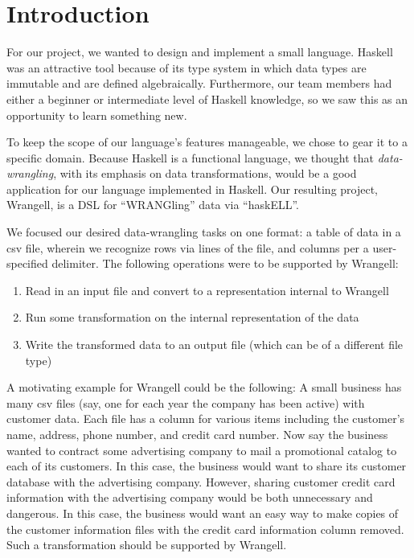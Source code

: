 \documentclass[preprint,nocopyrightspace]{sig-alternate}
\begin{document}
\section{Introduction}
For our project, we wanted to design and implement a small language. Haskell was an attractive tool because of its type system in which data types are immutable and are defined algebraically. Furthermore, our team members had either a beginner or intermediate level of Haskell knowledge, so we saw this as an opportunity to learn something new. 

To keep the scope of our language's features manageable, we chose to gear it to a specific domain. Because Haskell is a functional language, we thought that \emph{data-wrangling}, with its emphasis on data transformations, would be a good application for our language implemented in Haskell. Our resulting project, Wrangell, is a DSL for ``WRANGling'' data via ``haskELL''.  

We focused our desired data-wrangling tasks on one format: a table of data in a csv file, wherein we recognize rows via lines of the file, and columns per a user-specified delimiter. The following operations were to be supported by Wrangell:

\begin{comment}
\begin{enumerate}
\item Read in an input filename, output filename
\item Read in and parse a csv file per a filename 
\item Run some transformation on the data in the file
\item Write the transformed data to an output file
\end{enumerate}
\end{comment}

\begin{enumerate}
\item Read in an input file and convert to a representation internal to Wrangell
\item Run some transformation on the internal representation of the data
\item Write the transformed data to an output file (which can be of a different file type) 
\end{enumerate}


A motivating example for Wrangell could be the following: A small business has many csv files (say, one for each year the company has been active) with customer data. Each file has a column for various items including the customer's name, address, phone number, and credit card number. Now say the business wanted to contract some advertising company to mail a promotional catalog to each of its customers. In this case, the business would want to share its customer database with the advertising company. However, sharing customer credit card information with the advertising company would be both unnecessary and dangerous. In this case,  the business would want an easy way to make copies of the customer information files with the credit card information column removed. Such a transformation should be supported by Wrangell.    
\end{document}
